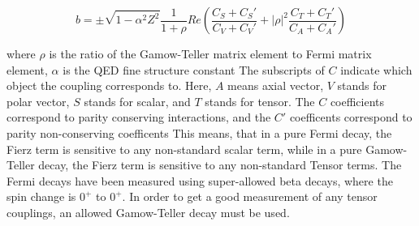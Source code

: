 \documentclass[main.tex]{subfiles}
\begin{document}
\begin{equation}
	b =  \pm \sqrt{1 - \alpha^{2}{Z^{2}}}\frac{1}{1 + \rho}Re(\frac{C_{S} + C_{S}'}{C_{V} + C_{V}'} + |\rho|^{2}\frac{C_{T} + C_{T}'}{C_{A} + C_{A}'})
	\label{eq:bwrittenout}
\end{equation}

where $\rho$ is the ratio of the Gamow-Teller matrix element to Fermi matrix element, $\alpha$ is the QED fine structure constant \cite{Gon19}
The subscripts of $C$ indicate which object the coupling corresponds to. 
Here, $A$ means axial vector, $V$ stands for polar vector, $S$ stands for scalar, and $T$ stands for tensor. 
The $C$ coefficients correspond to parity conserving interactions, and the $C'$ coefficents correspond to parity non-conserving coefficents \cite{Lee56}
This means, that in a pure Fermi decay, the Fierz term is sensitive to any non-standard scalar term, while in a pure Gamow-Teller decay, the Fierz term is sensitive to any non-standard Tensor terms. 
The Fermi decays have been measured using super-allowed beta decays, where the spin change is $0^{+}$ to $0^{+}$. 
In order to get a good measurement of any tensor couplings, an allowed Gamow-Teller decay must be used. 
 
\end{document}
